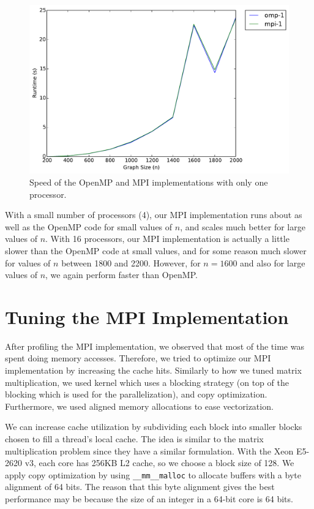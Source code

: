\documentclass[11pt]{article}
\begin{document}
\begin{figure}[h]
	\centering
	\includegraphics[width=.8\textwidth]{serial.pdf}
	\caption{Speed of the OpenMP and MPI implementations with only one processor.}
	\label{fig:serial}
\end{figure}

With a small number of processors (4), our MPI implementation runs about as well as the OpenMP code for small values of $n$, and scales much better for large values of $n$.
With 16 processors, our MPI implementation is actually a little slower than the OpenMP code at small values, and for some reason much slower for values of $n$ between 1800 and 2200.
However, for $n = 1600$ and also for large values of $n$, we again perform faster than OpenMP.


\section{Tuning the MPI Implementation}
After profiling the MPI implementation, we observed that most of the time was spent doing memory accesses. Therefore, we tried to optimize our MPI implementation by increasing the cache hits. 
Similarly to how we tuned matrix multiplication, we used kernel which uses a blocking strategy (on top of the blocking which is used for the parallelization), and copy optimization. 
Furthermore, we used aligned memory allocations to ease vectorization. 


We can increase cache utilization by subdividing each block into smaller blocks chosen to fill a thread's local cache.
The idea is similar to the matrix multiplication problem since they have a similar formulation.
With the Xeon E5-2620 v3, each core has 256KB L2 cache, so we choose a block size of 128. 
We apply copy optimization by using \texttt{\_\_mm\_\_malloc} to allocate buffers with a byte alignment of 64 bits. 
The reason that this byte alignment gives the best performance may be because the size of an integer in a 64-bit core is 64 bits. 
\end{document}
